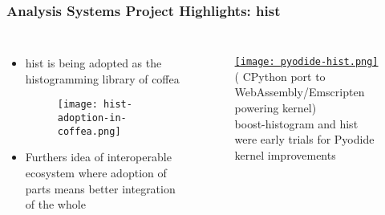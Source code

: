 \begin{frame}
  \frametitle{Analysis Systems Project Highlights: hist}

  \begin{columns}
    \begin{itemize}\setlength{\itemsep}{0.1 cm}
      \item hist is being adopted as the histogramming library of coffea
      \begin{figure}
        \begin{center}
          \texttt{[image: hist-adoption-in-coffea.png]}
        \end{center}
      \end{figure}
      \item Furthers idea of interoperable ecosystem where adoption of parts means better integration of the whole
    \end{itemize}
%
    \begin{figure}
        \begin{center}
            \href{https://github.com/jpivarski-talks/2022-07-11-scipy-loopy-tutorial}{\texttt{[image: pyodide-hist.png]}}
            {\tiny ( CPython port to WebAssembly/Emscripten powering  kernel)}\\boost-histogram and hist were early trials for Pyodide kernel improvements
        \end{center}
    \end{figure}
  \end{columns}

\end{frame}

